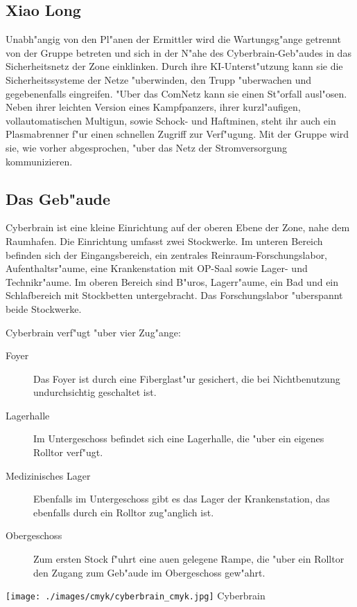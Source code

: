 \subsection[\xl{}]{Xiao Long} 
Unabh"angig von den Pl"anen der Ermittler wird \xl{} die Wartungsg"ange getrennt von der Gruppe betreten und sich in der N"ahe des Cyberbrain-Geb"audes in das Sicherheitsnetz der Zone einklinken. Durch ihre KI-Unterst"utzung kann sie die Sicherheitssysteme der Netze "uberwinden, den Trupp "uberwachen und gegebenenfalls eingreifen. "Uber das ComNetz kann sie einen St"orfall ausl"osen. Neben ihrer leichten Version eines Kampfpanzers, ihrer kurzl"aufigen, vollautomatischen Multigun, sowie Schock- und Haftminen, steht ihr auch ein Plasmabrenner f"ur einen schnellen Zugriff zur Verf"ugung. Mit der Gruppe wird sie, wie vorher abgesprochen, "uber das Netz der Stromversorgung kommunizieren.

\subsection{Das Geb"aude} 
Cyberbrain ist eine kleine Einrichtung auf der oberen Ebene der Zone, nahe dem Raumhafen. Die Einrichtung umfasst zwei Stockwerke. Im unteren Bereich befinden sich der Eingangsbereich, ein zentrales Reinraum-Forschungslabor, Aufenthaltsr"aume, eine Krankenstation mit OP-Saal sowie Lager- und Technikr"aume. Im oberen Bereich sind B"uros, Lagerr"aume, ein Bad und ein Schlafbereich mit Stockbetten untergebracht. Das Forschungslabor "uberspannt beide Stockwerke.

Cyberbrain verf"ugt "uber vier Zug"ange:

\begin{description}
	\item[Foyer] Das Foyer ist durch eine Fiberglast"ur gesichert, die bei Nichtbenutzung undurchsichtig geschaltet ist.
	\item[Lagerhalle] Im Untergeschoss befindet sich eine Lagerhalle, die "uber ein eigenes Rolltor verf"ugt.
	\item[Medizinisches Lager] Ebenfalls im Untergeschoss gibt es das Lager der Krankenstation, das ebenfalls durch ein Rolltor zug"anglich 		ist.
	\item[Obergeschoss] Zum ersten Stock f"uhrt eine au\3en gelegene Rampe, die "uber ein Rolltor den Zugang zum Geb"aude im Obergeschoss 	
		gew"ahrt.
\end{description}

\begin{figure*}[htbp]
	\centering
    \texttt{[image: ./images/cmyk/cyberbrain\_cmyk.jpg]}
    \newline{}Cyberbrain
	\label{fig:cyberbrain}
\end{figure*}

